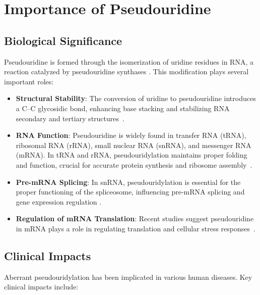 \section{Importance of Pseudouridine}\label{sec:importance-of-pseudouridine}
  \subsection*{Biological Significance}
    Pseudouridine is formed through the isomerization of uridine residues in RNA, a reaction catalyzed by pseudouridine synthases \cite{carlile_pseudouridine_2014}.
    This modification plays several important roles:

    \begin{itemize}
      \item \textbf{Structural Stability}: The conversion of uridine to pseudouridine introduces a C–C glycosidic bond, enhancing base stacking and stabilizing RNA secondary and tertiary structures~\cite{ge_rna_2013}.
      \item \textbf{RNA Function}: Pseudouridine is widely found in transfer RNA (tRNA), ribosomal RNA (rRNA), small nuclear RNA (snRNA), and messenger RNA (mRNA). In tRNA and rRNA, pseudouridylation maintains proper folding and function, crucial for accurate protein synthesis and ribosome assembly~\cite{schwartz_transcriptome-wide_2014}.
      \item \textbf{Pre-mRNA Splicing}: In snRNA, pseudouridylation is essential for the proper functioning of the spliceosome, influencing pre-mRNA splicing and gene expression regulation \cite{karijolich_converting_2011}.
      \item \textbf{Regulation of mRNA Translation}: Recent studies suggest pseudouridine in mRNA plays a role in regulating translation and cellular stress responses~\cite{carlile_pseudouridine_2014}.
    \end{itemize}

  \subsection*{Clinical Impacts}
    Aberrant pseudouridylation has been implicated in various human diseases. Key clinical impacts include:

